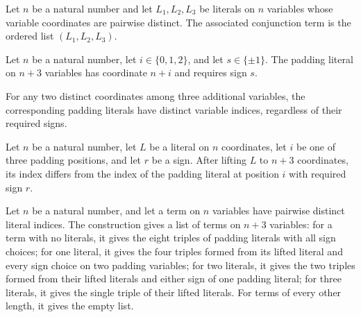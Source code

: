 \begin{definition}
\label{FABL.DNFTerm.ofThree}
\leanok
{}
Let $n$ be a natural number and let $L_1,L_2,L_3$ be literals on $n$ variables whose
variable coordinates are pairwise distinct. The associated conjunction term is the
ordered list $(L_1,L_2,L_3)$.
\end{definition}

\begin{definition}
\label{FABL.exactlyThreePaddingLiteral}
\leanok
{}
Let $n$ be a natural number, let $i\in\{0,1,2\}$, and let $s\in\{\pm1\}$. The padding
literal on $n+3$ variables has coordinate $n+i$ and requires sign $s$.
\end{definition}

\begin{theorem}
\label{FABL.exactlyThreePaddingLiteral_index_ne}
\leanok
{}
For any two distinct coordinates among three additional variables, the corresponding
padding literals have distinct variable indices, regardless of their required signs.
\end{theorem}

\begin{theorem}
\label{FABL.tseitinLiftLiteral_index_ne_exactlyThreePaddingLiteral}
\leanok
{}
Let $n$ be a natural number, let $L$ be a literal on $n$ coordinates, let $i$ be one of
three padding positions, and let $r$ be a sign. After lifting $L$ to $n+3$ coordinates,
its index differs from the index of the padding literal at position $i$ with required
sign $r$.
\end{theorem}

\begin{definition}
\label{FABL.exactlyThreePadClause}
\leanok
{}
Let $n$ be a natural number, and let a term on $n$ variables have pairwise distinct
literal indices. The construction gives a list of terms on $n+3$ variables: for a term
with no literals, it gives the eight triples of padding literals with all sign choices;
for one literal, it gives the four triples formed from its lifted literal and every sign
choice on two padding variables; for two literals, it gives the two triples formed from
their lifted literals and either sign of one padding literal; for three literals, it
gives the single triple of their lifted literals. For terms of every other length, it
gives the empty list.
\end{definition}


